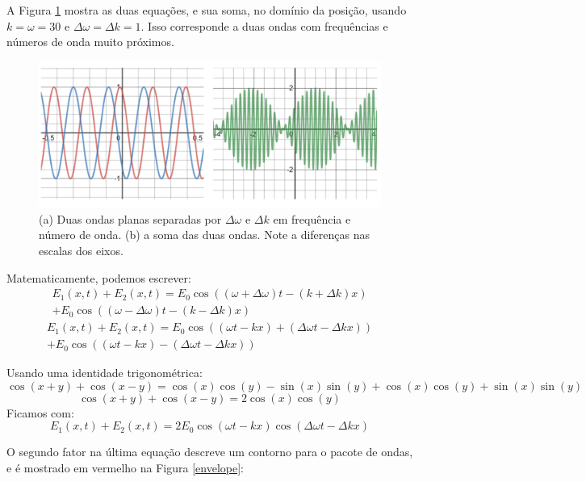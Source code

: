 \documentclass[12pt,a4paper]{report}
\begin{document}
A Figura \ref{group.velocity} mostra as duas equações, e sua soma, no domínio da posição, usando $k=\omega=30$ e $\Delta\omega=\Delta k =1$. Isso corresponde a duas ondas com frequências e números de onda muito próximos.

\begin{figure}[H]
    \centering
    \includegraphics[width=1\linewidth]{wave packet.png}
    \caption{(a) Duas ondas planas separadas por $\Delta\omega$ e $\Delta k$ em frequência e número de onda. (b) a soma das duas ondas. Note a diferenças nas escalas dos eixos.}
    \label{group.velocity}
\end{figure}

Matematicamente, podemos escrever:
\begin{multline*}
    E_1(x,t)+E_2(x,t)=E_0\cos((\omega+\Delta\omega)t-(k+\Delta k)x)\\
    +E_0\cos((\omega-\Delta\omega)t-(k-\Delta k)x)
\end{multline*}
\begin{multline*}
    E_1(x,t)+E_2(x,t)=E_0\cos((\omega t-kx)+(\Delta\omega t-\Delta k x))\\
    +E_0\cos((\omega t - kx)-(\Delta\omega t-\Delta kx))
\end{multline*}

Usando uma identidade trigonométrica:
\begin{equation*}
    \cos(x+y)+\cos(x-y)=\cos(x)\cos(y)-\sin(x)\sin(y)+\cos(x)\cos(y)+\sin(x)\sin(y)
\end{equation*}
\begin{equation*}
    \cos(x+y)+\cos(x-y)=2\cos(x)\cos(y)
\end{equation*}
Ficamos com:
\begin{equation}
    E_1(x,t)+E_2(x,t)=2E_0\cos(\omega t-kx)\cos(\Delta\omega t-\Delta k x)    
\end{equation}

O segundo fator na última equação descreve um contorno para o pacote de ondas, e é mostrado em vermelho na Figura \ref{envelope}:
\end{document}
